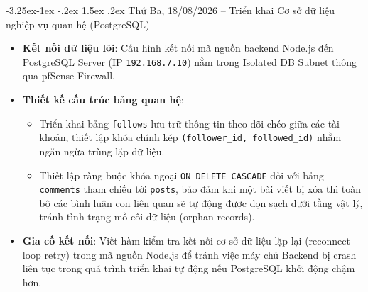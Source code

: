 \documentclass[12pt,a4paper]{article}
\makeatletter
\renewcommand\subsection{\@startsection{subsection}{2}{\z@}%
                                     {-3.25ex\@plus -1ex \@minus -.2ex}%
                                     {1.5ex \@plus .2ex}%
                                     {\normalfont\large\bfseries\color{cmcblue}}}
\makeatother
\begin{document}
\subsection{Thứ Ba, 18/08/2026 -- Triển khai Cơ sở dữ liệu nghiệp vụ quan hệ (PostgreSQL)}
\begin{itemize}
    \item \textbf{Kết nối dữ liệu lõi}: Cấu hình kết nối mã nguồn backend Node.js đến PostgreSQL Server (IP \texttt{192.168.7.10}) nằm trong Isolated DB Subnet thông qua pfSense Firewall.
    \item \textbf{Thiết kế cấu trúc bảng quan hệ}:
    \begin{itemize}[nosep]
        \item Triển khai bảng \texttt{follows} lưu trữ thông tin theo dõi chéo giữa các tài khoản, thiết lập khóa chính kép \texttt{(follower\_id, followed\_id)} nhằm ngăn ngừa trùng lặp dữ liệu.
        \item Thiết lập ràng buộc khóa ngoại \texttt{ON DELETE CASCADE} đối với bảng \texttt{comments} tham chiếu tới \texttt{posts}, bảo đảm khi một bài viết bị xóa thì toàn bộ các bình luận con liên quan sẽ tự động được dọn sạch dưới tầng vật lý, tránh tình trạng mồ côi dữ liệu (orphan records).
    \end{itemize}
    \item \textbf{Gia cố kết nối}: Viết hàm kiểm tra kết nối cơ sở dữ liệu lặp lại (reconnect loop retry) trong mã nguồn Node.js để tránh việc máy chủ Backend bị crash liên tục trong quá trình triển khai tự động nếu PostgreSQL khởi động chậm hơn.
\end{itemize}
\end{document}
